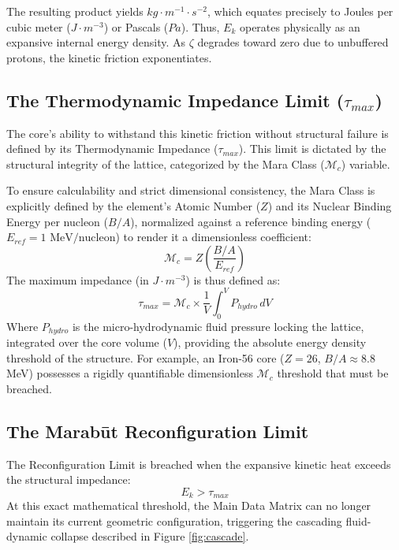 \documentclass[11pt, a4paper]{article}
\begin{document}
  The resulting product yields $kg \cdot m^{-1} \cdot s^{-2}$, which equates precisely to Joules per cubic meter ($J \cdot m^{-3}$) or Pascals ($Pa$). Thus, $E_k$ operates physically as an expansive internal energy density. As $\zeta$ degrades toward zero due to unbuffered protons, the kinetic friction exponentiates.

  \subsection{The Thermodynamic Impedance Limit (\texorpdfstring{$\tau_{max}$}{tau\_max})}
  The core's ability to withstand this kinetic friction without structural failure is defined by its Thermodynamic Impedance ($\tau_{max}$). This limit is dictated by the structural integrity of the lattice, categorized by the Mara Class ($\mathcal{M}_c$) variable.
  
  To ensure calculability and strict dimensional consistency, the Mara Class is explicitly defined by the element's Atomic Number ($Z$) and its Nuclear Binding Energy per nucleon ($B/A$), normalized against a reference binding energy ($E_{ref} = 1 \text{ MeV/nucleon}$) to render it a dimensionless coefficient:
  \begin{equation}
    \mathcal{M}_c = Z \left( \frac{B/A}{E_{ref}} \right)
  \end{equation}
  The maximum impedance (in $J \cdot m^{-3}$) is thus defined as:
  \begin{equation}
    \tau_{max} = \mathcal{M}_c \times \frac{1}{V} \int_{0}^{V} P_{hydro} \, dV
  \end{equation}
  Where $P_{hydro}$ is the micro-hydrodynamic fluid pressure locking the lattice, integrated over the core volume ($V$), providing the absolute energy density threshold of the structure. For example, an Iron-56 core ($Z=26$, $B/A \approx 8.8$ MeV) possesses a rigidly quantifiable dimensionless $\mathcal{M}_c$ threshold that must be breached.

  \subsection{The Marab\={u}t Reconfiguration Limit}
  The Reconfiguration Limit is breached when the expansive kinetic heat exceeds the structural impedance:
  \begin{equation}
    E_k > \tau_{max}
  \end{equation}
  At this exact mathematical threshold, the Main Data Matrix can no longer maintain its current geometric configuration, triggering the cascading fluid-dynamic collapse described in Figure \ref{fig:cascade}.
\end{document}
